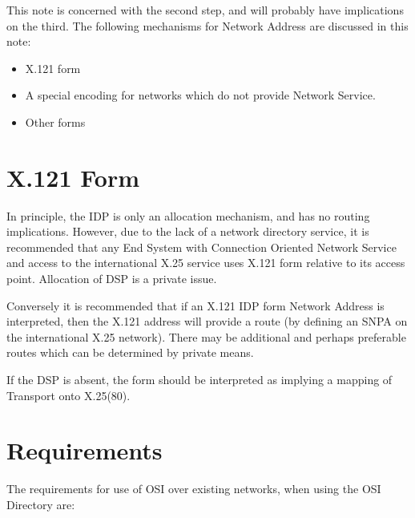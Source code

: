 This note is concerned with the second step, and will probably have
implications on the third.  The following mechanisms for Network
Address are discussed in this note:

\begin {itemize}
\item X.121 form
\item A special encoding for networks which do not provide Network
Service.
\item Other forms
\end {itemize}

\section {X.121 Form}

In principle, the IDP is only an allocation mechanism, and has no
routing implications.  However, due to the lack of a network
directory service, it is recommended that any End System with
Connection Oriented Network Service and access to the international
X.25 service uses X.121 form relative to its access point.
Allocation of DSP is a private issue.  

Conversely it is recommended that if an X.121 IDP form Network
Address is interpreted, then the X.121 address will provide a route (by
defining an SNPA on the international X.25 network).
There may be additional and perhaps preferable routes which can be
determined by private means.  

If the DSP is absent, the form should be interpreted as implying a mapping
of Transport onto X.25(80).   

\section {Requirements}

The requirements for use of OSI over existing networks, when using the
OSI Directory are:

